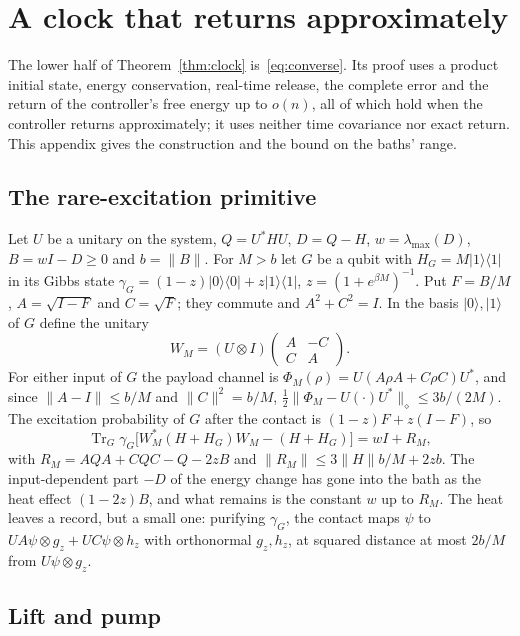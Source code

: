 \documentclass[11pt]{article}
\theoremstyle{definition}
\theoremstyle{remark}
\newcommand{\Tr}{\operatorname{Tr}}
\begin{document}
\section{A clock that returns approximately}\label{app:clock}

The lower half of Theorem~\ref{thm:clock} is~\eqref{eq:converse}. Its proof uses a product initial state, energy conservation, real-time release, the complete error and the return of the controller's free energy up to $o(n)$, all of which hold when the controller returns approximately; it uses neither time covariance nor exact return. This appendix gives the construction and the bound on the baths' range.

\subsection{The rare-excitation primitive}

Let $U$ be a unitary on the system, $Q=U^*HU$, $D=Q-H$, $w=\lambda_{\max}(D)$, $B=wI-D\ge0$ and $b=\|B\|$. For $M>b$ let $G$ be a qubit with $H_G=M|1\rangle\langle1|$ in its Gibbs state $\gamma_G=(1-z)|0\rangle\langle0|+z|1\rangle\langle1|$, $z=(1+e^{\beta M})^{-1}$. Put $F=B/M$, $A=\sqrt{I-F}$ and $C=\sqrt F$; they commute and $A^2+C^2=I$. In the basis $|0\rangle,|1\rangle$ of $G$ define the unitary
\[
W_M=(U\otimes I)\begin{pmatrix}A&-C\\C&A\end{pmatrix}.
\]
For either input of $G$ the payload channel is $\Phi_M(\rho)=U(A\rho A+C\rho C)U^*$, and since $\|A-I\|\le b/M$ and $\|C\|^2=b/M$, $\frac12\|\Phi_M-U(\cdot)U^*\|_\diamond\le3b/(2M)$. The excitation probability of $G$ after the contact is $(1-z)F+z(I-F)$, so
\[
\Tr_G\gamma_G\bigl[W_M^*(H+H_G)W_M-(H+H_G)\bigr]=wI+R_M,
\]
with $R_M=AQA+CQC-Q-2zB$ and $\|R_M\|\le3\|H\|b/M+2zb$.
The input-dependent part $-D$ of the energy change has gone into the bath as the heat effect $(1-2z)B$, and what remains is the constant $w$ up to $R_M$. The heat leaves a record, but a small one: purifying $\gamma_G$, the contact maps $\psi$ to $UA\psi\otimes g_z+UC\psi\otimes h_z$ with orthonormal $g_z,h_z$, at squared distance at most $2b/M$ from $U\psi\otimes g_z$.

\subsection{Lift and pump}
\end{document}
